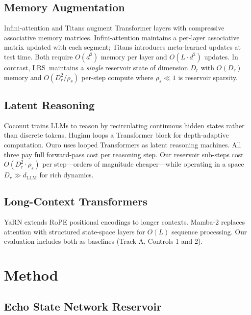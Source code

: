 \documentclass[11pt,a4paper]{article}
\newcommand{\LRS}{\textsc{LRS}}
\theoremstyle{definition}
\begin{document}
\subsection{Memory Augmentation}

Infini-attention \citep{munkhdalai2024infini} and Titans
\citep{behrouz2025titans} augment Transformer layers with compressive
associative memory matrices.  Infini-attention maintains a per-layer
associative matrix updated with each segment; Titans introduces meta-learned
updates at test time.  Both require $O(d^2)$ memory per layer and $O(L \cdot
d^2)$ updates.  In contrast, \LRS\ maintains a \emph{single} reservoir state
of dimension $D_r$ with $O(D_r)$ memory and $O(D_r^2 / \rho_s)$ per-step
compute where $\rho_s \ll 1$ is reservoir sparsity.

\subsection{Latent Reasoning}

Coconut \citep{hao2024coconut} trains LLMs to reason by recirculating
continuous hidden states rather than discrete tokens.  Huginn
\citep{geiping2025huginn} loops a Transformer block for depth-adaptive
computation.  Ouro \citep{srivastava2025ouro} uses looped Transformers as
latent reasoning machines.  All three pay full forward-pass cost per
reasoning step.  Our reservoir sub-steps cost $O(D_r^2 \cdot \rho_s)$ per
step---orders of magnitude cheaper---while operating in a space $D_r \gg
d_{\mathrm{LLM}}$ for rich dynamics.

\subsection{Long-Context Transformers}

YaRN \citep{peng2023yarn} extends RoPE positional encodings to longer
contexts.  Mamba-2 \citep{gu2023mamba,dao2024transformers} replaces attention
with structured state-space layers for $O(L)$ sequence processing.  Our
evaluation includes both as baselines (Track A, Controls 1 and 2).

\section{Method}
\label{sec:method}

\subsection{Echo State Network Reservoir}
\label{sec:esn}
\end{document}
